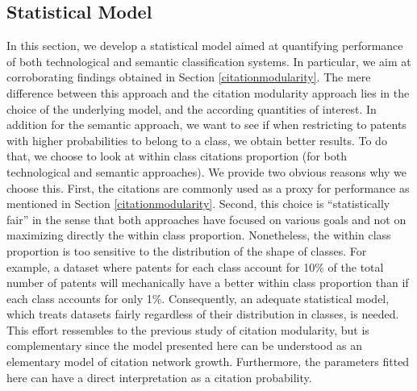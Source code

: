\documentclass[10pt,A4,draft]{article}
\begin{document}
\subsection{Statistical Model}
\label{statisticalmodel}
In this section, we develop a statistical model aimed at quantifying performance of both technological and semantic classification systems. In particular, we aim at corroborating findings obtained in Section \ref{citationmodularity}. The mere difference between this approach and the citation modularity approach lies in the choice of the underlying model, and the according quantities of interest. In addition for the semantic approach, we want to see if when restricting to patents with higher probabilities to belong to a class, we obtain better results. To do that, we choose to look at within class citations proportion (for both technological and semantic approaches). We provide two obvious reasons why we choose this. First, the citations are commonly used as a proxy for performance as mentioned in Section \ref{citationmodularity}. Second, this choice is ``statistically fair'' in the sense that both approaches have focused on various goals and not on maximizing directly the within class proportion. 
Nonetheless, the within class proportion is too sensitive to the distribution of the shape of classes. For example, a dataset where patents for each class account for 10\% of the total number of patents will mechanically have a better within class proportion than if each class accounts for only 1\%. Consequently, an adequate statistical model, which treats datasets fairly regardless of their distribution in classes, is needed. This effort ressembles to the previous study of citation modularity, but is complementary since the model presented here can be understood as an elementary model of citation network growth. Furthermore, the parameters fitted here can have a direct interpretation as a citation probability.
\end{document}
